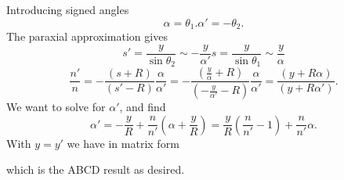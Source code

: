 {Introducing signed angles
\begin{subequations}
\begin{equation}\label{eqn:convexNonParaxial:120}
\alpha = \theta_1.
\end{equation}
\begin{equation}\label{eqn:convexNonParaxial:140}
\alpha' = -\theta_2.
\end{equation}
\end{subequations}
%
The paraxial approximation gives
%
\begin{subequations}
\begin{equation}\label{eqn:convexNonParaxial:160}
s' = \frac{y}{\sin\theta_2} \sim -\frac{y}{\alpha'}
\end{equation}
\begin{equation}\label{eqn:convexNonParaxial:180}
s = \frac{y}{\sin\theta_1} \sim \frac{y}{\alpha}
\end{equation}
\end{subequations}
%
\begin{equation}\label{eqn:convexNonParaxial:200}
\frac{n'}{n}
=
-\frac{
(s + R)
}
{
(s' - R)
}
\frac{
\alpha
}
{
\alpha'
}
=
-\frac{
\left( \frac{y}{\alpha} + R \right)
}
{
\left(-\frac{y}{\alpha'} - R \right)
}
\frac{
\alpha
}
{
\alpha'
}
=
\frac{
\left( y + R \alpha \right)
}
{
\left( y + R \alpha' \right)
}.
\end{equation}
%
We want to solve for \(\alpha'\), and find
%
\begin{equation}\label{eqn:convexNonParaxial:220}
\alpha'
= -\frac{y}{R} + \frac{n}{n'} \left( \alpha + \frac{y}{R} \right)
= \frac{y}{R} \left( \frac{n}{n'} - 1 \right) + \frac{n}{n'} \alpha.
\end{equation}
%
With \(y = y'\) we have in matrix form
%

which is the ABCD result as desired.
} %

